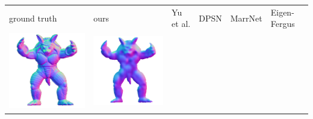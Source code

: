 \begin{tabularx}{\linewidth}{@{}Y@{}Y@{}Y@{}Y@{}Y@{}Y@{}}
ground truth & ours & Yu et al. & DPSN & MarrNet & Eigen-Fergus \\
\includegraphics[width=\linewidth]{semisynthetic/20160617_22_gt.png} &
\includegraphics[width=\linewidth]{semisynthetic/20160617_22_ours_out.png} &

\end{tabularx}
